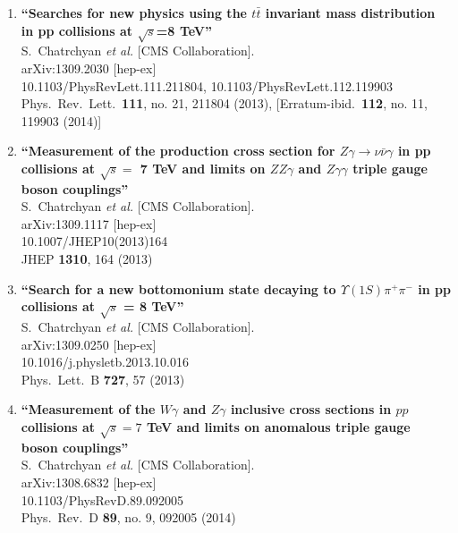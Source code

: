 \documentclass{article}
\begin{document}
\begin{enumerate}
\item%
{\bf ``Searches for new physics using the $t\bar{t}$ invariant mass distribution in pp collisions at $\sqrt{s}$=8  TeV''}
  \\{}S.~Chatrchyan {\it et al.}  [CMS Collaboration].
  \\{}arXiv:1309.2030 [hep-ex]
    \\{}10.1103/PhysRevLett.111.211804, 10.1103/PhysRevLett.112.119903
\\{}Phys.\ Rev.\ Lett.\  {\bf 111}, no. 21, 211804 (2013), [Erratum-ibid.\  {\bf 112}, no. 11, 119903 (2014)] %


\item%
{\bf ``Measurement of the production cross section for $Z\gamma \to \nu\bar{\nu}\gamma$ in pp collisions at $\sqrt{s} =$ 7 TeV and limits on $ZZ\gamma$ and $Z\gamma\gamma$ triple gauge boson couplings''}
  \\{}S.~Chatrchyan {\it et al.}  [CMS Collaboration].
  \\{}arXiv:1309.1117 [hep-ex]
    \\{}10.1007/JHEP10(2013)164
\\{}JHEP {\bf 1310}, 164 (2013) %


\item%
{\bf ``Search for a new bottomonium state decaying to $\Upsilon(1S)\pi^+\pi^-$ in pp collisions at $\sqrt{s}$ = 8 TeV''}
  \\{}S.~Chatrchyan {\it et al.}  [CMS Collaboration].
  \\{}arXiv:1309.0250 [hep-ex]
    \\{}10.1016/j.physletb.2013.10.016
\\{}Phys.\ Lett.\ B {\bf 727}, 57 (2013) %


\item%
{\bf ``Measurement of the $W\gamma$ and $Z\gamma$ inclusive cross sections in $pp$ collisions at $\sqrt s=7$  TeV and limits on anomalous triple gauge boson couplings''}
  \\{}S.~Chatrchyan {\it et al.}  [CMS Collaboration].
  \\{}arXiv:1308.6832 [hep-ex]
    \\{}10.1103/PhysRevD.89.092005
\\{}Phys.\ Rev.\ D {\bf 89}, no. 9, 092005 (2014) %



\end{enumerate}
\end{document}
